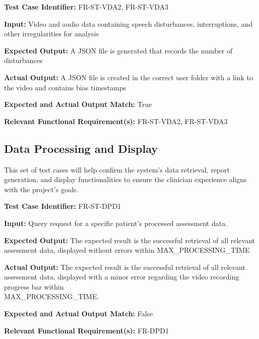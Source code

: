 \documentclass[12pt, titlepage]{article}
\begin{document}
\begin{mdframed}[linewidth=0.5mm] \par
  \textbf{Test Case Identifier:} FR-ST-VDA2, FR-ST-VDA3 \par
  \textbf{Input:} Video and audio data containing speech disturbances, interruptions, and other irregularities for analysis \par
  \textbf{Expected Output:} A JSON file is generated that records the number of disturbances \par
  \textbf{Actual Output:} A JSON file is created in the correct user folder with a link to the video and contains bias timestamps\par
  \textbf{Expected and Actual Output Match:} True \par
  \textbf{Relevant Functional Requirement(s):} FR-ST-VDA2, FR-ST-VDA3
\end{mdframed}

\newpage{}

\subsection{Data Processing and Display}
\hspace{2em}This set of test cases will help confirm the system's data retrieval, report generation, 
and display functionalities to ensure the clinician experience aligns with the project’s goals.

\begin{mdframed}[linewidth=0.5mm] \par
  \textbf{Test Case Identifier:} FR-ST-DPD1 \par
  \textbf{Input:} Query request for a specific patient’s processed assessment data. \par
  \textbf{Expected Output:} The expected result is the successful retrieval of all relevant assessment data, displayed without errors within MAX\_PROCESSING\_TIME \par
  \textbf{Actual Output:} The expected result is the successful retrieval of all relevant assessment data, displayed with a minor error regarding the video recording progress bar within \\MAX\_PROCESSING\_TIME.  \par
  \textbf{Expected and Actual Output Match:} False \par
  \textbf{Relevant Functional Requirement(s):} FR-DPD1
\end{mdframed}
\end{document}
